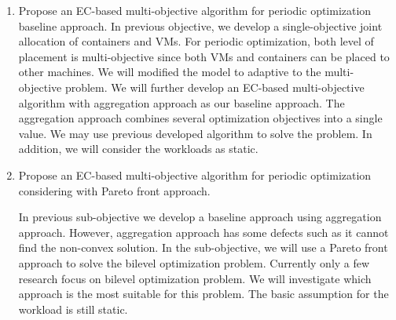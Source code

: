 \begin{enumerate}
	\item Propose an EC-based multi-objective algorithm for periodic optimization baseline approach.
	In previous objective, we develop a single-objective joint allocation of containers and VMs.  For periodic optimization, both level of placement is multi-objective since both VMs and containers can be placed to other machines. We will modified the model to adaptive to the multi-objective problem. We will further develop an EC-based multi-objective algorithm with aggregation approach as our baseline approach. The aggregation approach combines several optimization objectives into a single value. We may use previous developed algorithm to solve the problem. In addition, we will consider the workloads as static. 

	\item Propose an EC-based multi-objective algorithm for periodic optimization considering with Pareto front approach.

	In previous sub-objective we develop a baseline approach using aggregation approach. However, aggregation approach has some defects such as it cannot find the non-convex solution. In the sub-objective, we will use a Pareto front approach to solve the bilevel optimization problem. Currently only a few research \cite{Yin:2000bt, Deb:2009ug,Deb:2010in} focus on bilevel optimization problem. We will investigate which approach is the most suitable for this problem.
	The basic assumption for the workload is still static.



\end{enumerate}
